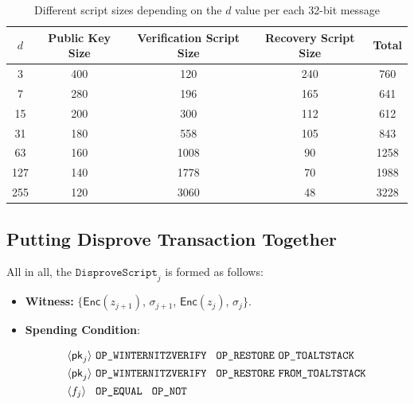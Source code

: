\documentclass{iacrtrans}
\newcommand{\elem}[1]{\, \langle #1 \rangle \,}
\newcommand{\opcode}[1]{\, \texttt{#1} \,}
\begin{document}

\begin{table}[H]
  \centering
  \begin{tabular}{ccccc}
    \toprule
    $d$ & Public Key Size & Verification Script Size & Recovery
    Script Size & Total \\
    \midrule
    3 & 400 & 120 & 240 & 760 \\
    7 & 280 & 196 & 165 & 641 \\
    15 & 200 & 300 & 112 & 612 \\
    31 & 180 & 558 & 105 & 843 \\
    63 & 160 & 1008 & 90 & 1258 \\
    127 & 140 & 1778 & 70 & 1988 \\
    255 & 120 & 3060 & 48 & 3228 \\
    \bottomrule
  \end{tabular}
  \caption{Different script sizes depending on the $d$
  value per each 32-bit message}\label{tab:winternitz-script-size}
\end{table}

\subsection{Putting Disprove Transaction Together}

All in all, the $\mathtt{DisproveScript}_{j}$ is formed as follows:
\begin{itemize}
  \item \textbf{Witness:} $\Big\{\mathsf{Enc}(z_{j+1})$, $\sigma_{j+1}$, $\mathsf{Enc}(z_{j})$, $\sigma_j\Big\}$.
  \item \textbf{Spending Condition}:
  \begin{empheqboxed}
    \begin{align*}
      &\elem{\mathsf{pk}_j} \opcode{\texttt{OP\_WINTERNITZVERIFY} } \opcode{\texttt{OP\_RESTORE}} \opcode{\texttt{OP\_TOALTSTACK}} \\
      &\elem{\mathsf{pk}_{j}} \opcode{\texttt{OP\_WINTERNITZVERIFY} } \opcode{\texttt{OP\_RESTORE}} \opcode{\texttt{FROM\_TOALTSTACK}} \\
      &\elem{f_j} \opcode{ \texttt{OP\_EQUAL} } \opcode{\texttt{OP\_NOT}}
    \end{align*}
  \end{empheqboxed}
\end{itemize}
\end{document}
